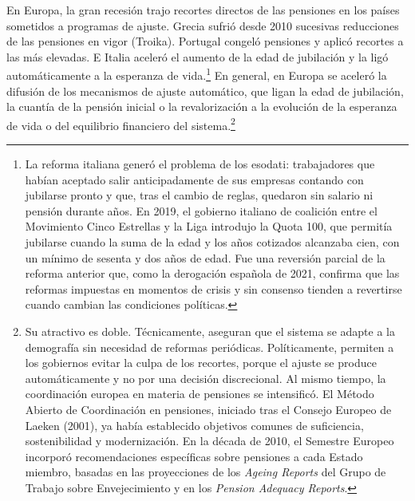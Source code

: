 \documentclass[10pt,a4paper]{article}
\begin{document}
En Europa, la gran recesión trajo recortes directos de las pensiones en los países sometidos a programas de ajuste. Grecia sufrió desde 2010 sucesivas reducciones de las pensiones en vigor (Troika). Portugal congeló pensiones y aplicó recortes a las más elevadas. E Italia aceleró el aumento de la edad de jubilación y la ligó automáticamente a la esperanza de vida.\footnote{La reforma italiana generó el problema de los esodati: trabajadores que habían aceptado salir anticipadamente de sus empresas contando con jubilarse pronto y que, tras el cambio de reglas, quedaron sin salario ni pensión durante años. En 2019, el gobierno italiano de coalición entre el Movimiento Cinco Estrellas y la Liga introdujo la Quota 100, que permitía jubilarse cuando la suma de la edad y los años cotizados alcanzaba cien, con un mínimo de sesenta y dos años de edad. Fue una reversión parcial de la reforma anterior que, como la derogación española de 2021, confirma que las reformas impuestas en momentos de crisis y sin consenso tienden a revertirse cuando cambian las condiciones políticas.
} En general, en Europa se aceleró la difusión de los mecanismos de ajuste automático, que ligan la edad de jubilación, la cuantía de la pensión inicial o la revalorización a la evolución de la esperanza de vida o del equilibrio financiero del sistema.\footnote{Su atractivo es doble. Técnicamente, aseguran que el sistema se adapte a la demografía sin necesidad de reformas periódicas. Políticamente, permiten a los gobiernos evitar la culpa de los recortes, porque el ajuste se produce automáticamente y no por una decisión discrecional. Al mismo tiempo, la coordinación europea en materia de pensiones se intensificó. El Método Abierto de Coordinación en pensiones, iniciado tras el Consejo Europeo de Laeken (2001), ya había establecido objetivos comunes de suficiencia, sostenibilidad y modernización. En la década de 2010, el Semestre Europeo incorporó recomendaciones específicas sobre pensiones a cada Estado miembro, basadas en las proyecciones de los \textit{Ageing Reports} del Grupo de Trabajo sobre Envejecimiento y en los \textit{Pension Adequacy Reports}.
}
\end{document}
